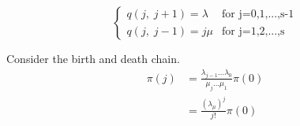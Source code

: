 \documentclass[12pt]{article}
\begin{document}
\begin{enumerate}
$$\begin{cases}
q(j,\;j+1)=\lambda &\text{for j=0,1,...,s-1}\\
q(j,\;j-1)=j\mu &\text{for j=1,2,...,s}
\end{cases}$$

Consider the birth and death chain.
\vspace{1\baselineskip}
\begin{align}
  \pi(j) &= \frac{\lambda_{j-1}\ldots\lambda_0}{\mu_j\ldots\mu_1}\pi(0)  \tag{where $q(j,\;j+1)=\lambda_j$ and $q(j,\;j-1)= \mu_j$} \\
  & = \frac{(\lambda_\mu)^j}{j!}\pi(0) \nonumber
\end{align}

\end{enumerate}
\end{document}
